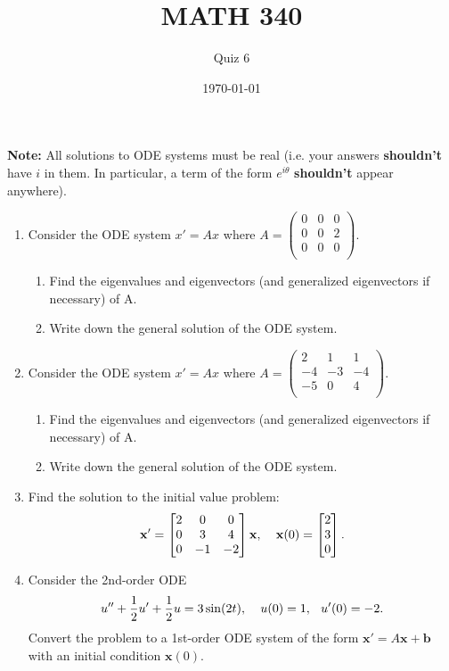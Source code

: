 \documentclass{article}
\begin{document}
\title{MATH 340}
\author{Quiz 6}
\date{\today}
\maketitle

\textbf{Note:} All solutions to ODE systems must be real (i.e. your answers
\textbf{shouldn't} have $i$ in them. In particular, a term of the form
$e^{i\theta}$ \textbf{shouldn't} appear anywhere).

\begin{enumerate}

\item Consider the ODE system $x'=Ax$ where $
	A=\begin{pmatrix}
		 0 &  0 & 0\\
		 0 &  0 & 2\\
		 0 &  0 & 0\\
	\end{pmatrix}
$.

\begin{enumerate}
	\item Find the eigenvalues and eigenvectors (and generalized eigenvectors if necessary) of A.
	\item Write down the general solution of the ODE system.
\end{enumerate}

\item Consider the ODE system $x'=Ax$ where $
	A=\begin{pmatrix}
		  2 &   1 &  1\\
		 -4 &  -3 & -4\\
		 -5 &   0 &  4\\
	\end{pmatrix}
$.

\begin{enumerate}
	\item Find the eigenvalues and eigenvectors (and generalized eigenvectors if necessary) of A.
	\item Write down the general solution of the ODE system.
\end{enumerate}

\item Find the solution to the initial value problem:
\[
\mathbf{x}'=\begin{bmatrix}2 & 0 & 0 \\
		0  & 3 & 4 \\
	0 & -1 & -2\end{bmatrix}
\mathbf{x},\hspace{.15in} \mathbf{x}(0) =
\begin{bmatrix}2 \\ 3 \\ 0\end{bmatrix}.
\]
    \item Consider the 2nd-order ODE $$u''+\frac{1}{2}u'+\frac{1}{2}u = 3\sin(2t), \hspace{.15in} u(0)=1, \hspace{.1in} u'(0)=-2.$$  Convert the problem to a 1st-order ODE system of the form $\mathbf{x}'=A\mathbf{x}+\mathbf{b}$ with an initial condition $\mathbf{x}(0)$.
\end{enumerate}
\end{document}
